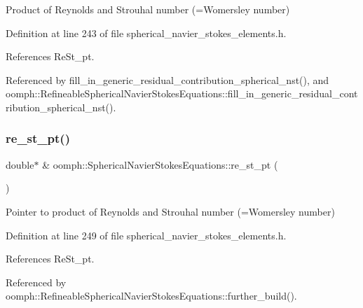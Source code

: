 Product of Reynolds and Strouhal number (=Womersley number) 



Definition at line 243 of file spherical\+\_\+navier\+\_\+stokes\+\_\+elements.\+h.



References Re\+St\+\_\+pt.



Referenced by fill\+\_\+in\+\_\+generic\+\_\+residual\+\_\+contribution\+\_\+spherical\+\_\+nst(), and oomph\+::\+Refineable\+Spherical\+Navier\+Stokes\+Equations\+::fill\+\_\+in\+\_\+generic\+\_\+residual\+\_\+contribution\+\_\+spherical\+\_\+nst().

\mbox{\label{classoomph_1_1SphericalNavierStokesEquations_ac626bfa171be369005086f0d398d4053}} 
\subsubsection{\texorpdfstring{re\+\_\+st\+\_\+pt()}{re\_st\_pt()}}
{\footnotesize\ttfamily double$\ast$ \& oomph\+::\+Spherical\+Navier\+Stokes\+Equations\+::re\+\_\+st\+\_\+pt (\begin{DoxyParamCaption}{ }\end{DoxyParamCaption})\hspace{0.3cm}{\ttfamily [inline]}}



Pointer to product of Reynolds and Strouhal number (=Womersley number) 



Definition at line 249 of file spherical\+\_\+navier\+\_\+stokes\+\_\+elements.\+h.



References Re\+St\+\_\+pt.



Referenced by oomph\+::\+Refineable\+Spherical\+Navier\+Stokes\+Equations\+::further\+\_\+build().

\mbox{\label{classoomph_1_1SphericalNavierStokesEquations_a043b034d3113a7e7aabb058fd950f90c}} 
